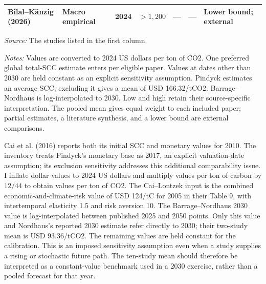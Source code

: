 \documentclass[11pt]{article}
\begin{document}
\begin{landscape}
\begin{table}[htbp]
\begin{tabular}{lllrrrl}
Bilal--K\"anzig (2026) & Macro empirical & 2024 & $>1,200$ & --- & --- & Lower bound; external \\\bottomrule
\end{tabular}
\begin{minipage}{0.98\linewidth}\small
\textit{Source:} The studies listed in the first column.\par
\textit{Notes:} Values are converted to 2024 US dollars per ton of CO2. One preferred global total-SCC estimate enters per eligible paper. Values at dates other than 2030 are held constant as an explicit sensitivity assumption. Pindyck estimates an average SCC; excluding it gives a mean of USD 166.32/tCO2. Barrage--Nordhaus is log-interpolated to 2030. Low and high retain their source-specific interpretation. The pooled mean gives equal weight to each included paper; partial estimates, a literature synthesis, and a lower bound are external comparisons.
\end{minipage}\end{table}\end{landscape}

Cai et al. (2016) reports both its initial SCC and monetary values for 2010. The inventory treats Pindyck's monetary base as 2017, an explicit valuation-date assumption; its exclusion sensitivity addresses this additional comparability issue. I inflate dollar values to 2024 US dollars and multiply values per ton of carbon by $12/44$ to obtain values per ton of CO2. The Cai--Lontzek input is the combined economic-and-climate-risk value of USD 124/tC for 2005 in their Table 9, with intertemporal elasticity 1.5 and risk aversion 10. The Barrage--Nordhaus 2030 value is log-interpolated between published 2025 and 2050 points. Only this value and Nordhaus's reported 2030 estimate refer directly to 2030; their two-study mean is USD 93.36/tCO2. The remaining values are held constant for the calibration. This is an imposed sensitivity assumption even when a study supplies a rising or stochastic future path. The ten-study mean should therefore be interpreted as a constant-value benchmark used in a 2030 exercise, rather than a pooled forecast for that year.
\end{document}
